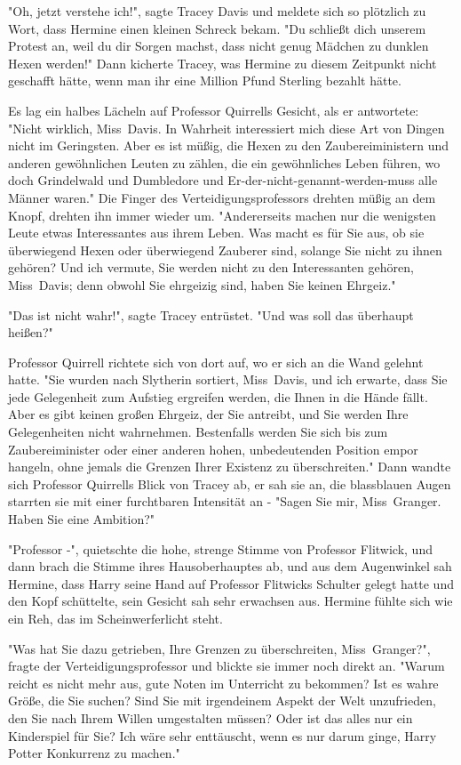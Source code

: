 {"Oh, jetzt verstehe ich!", sagte Tracey Davis und meldete sich so plötzlich zu Wort, dass Hermine einen kleinen Schreck bekam. "Du schließt dich unserem Protest an, weil du dir Sorgen machst, dass nicht genug Mädchen zu dunklen Hexen werden!" Dann kicherte Tracey, was Hermine zu diesem Zeitpunkt nicht geschafft hätte, wenn man ihr eine Million Pfund Sterling bezahlt hätte.

Es lag ein halbes Lächeln auf Professor Quirrells Gesicht, als er antwortete: "Nicht wirklich, Miss~Davis. In Wahrheit interessiert mich diese Art von Dingen nicht im Geringsten. Aber es ist müßig, die Hexen zu den Zaubereiministern und anderen gewöhnlichen Leuten zu zählen, die ein gewöhnliches Leben führen, wo doch Grindelwald und Dumbledore und Er-der-nicht-genannt-werden-muss alle Männer waren." Die Finger des Verteidigungsprofessors drehten müßig an dem Knopf, drehten ihn immer wieder um. "Andererseits machen nur die wenigsten Leute etwas Interessantes aus ihrem Leben. Was macht es für Sie aus, ob sie überwiegend Hexen oder überwiegend Zauberer sind, solange Sie nicht zu ihnen gehören? Und ich vermute, Sie werden nicht zu den Interessanten gehören, Miss~Davis; denn obwohl Sie ehrgeizig sind, haben Sie keinen Ehrgeiz."

"Das ist nicht wahr!", sagte Tracey entrüstet. "Und was soll das überhaupt heißen?"

Professor Quirrell richtete sich von dort auf, wo er sich an die Wand gelehnt hatte. "Sie wurden nach Slytherin sortiert, Miss~Davis, und ich erwarte, dass Sie jede Gelegenheit zum Aufstieg ergreifen werden, die Ihnen in die Hände fällt. Aber es gibt keinen großen Ehrgeiz, der Sie antreibt, und Sie werden Ihre Gelegenheiten nicht wahrnehmen. Bestenfalls werden Sie sich bis zum Zaubereiminister oder einer anderen hohen, unbedeutenden Position empor hangeln, ohne jemals die Grenzen Ihrer Existenz zu überschreiten." Dann wandte sich Professor Quirrells Blick von Tracey ab, er sah sie an, die blassblauen Augen starrten sie mit einer furchtbaren Intensität an - "Sagen Sie mir, Miss~Granger. Haben Sie eine Ambition?"

"Professor -", quietschte die hohe, strenge Stimme von Professor Flitwick, und dann brach die Stimme ihres Hausoberhauptes ab, und aus dem Augenwinkel sah Hermine, dass Harry seine Hand auf Professor Flitwicks Schulter gelegt hatte und den Kopf schüttelte, sein Gesicht sah sehr erwachsen aus. Hermine fühlte sich wie ein Reh, das im Scheinwerferlicht steht.

"Was hat Sie dazu getrieben, Ihre Grenzen zu überschreiten, Miss~Granger?", fragte der Verteidigungsprofessor und blickte sie immer noch direkt an. "Warum reicht es nicht mehr aus, gute Noten im Unterricht zu bekommen? Ist es wahre Größe, die Sie suchen? Sind Sie mit irgendeinem Aspekt der Welt unzufrieden, den Sie nach Ihrem Willen umgestalten müssen? Oder ist das alles nur ein Kinderspiel für Sie? Ich wäre sehr enttäuscht, wenn es nur darum ginge, Harry Potter Konkurrenz zu machen."

}
